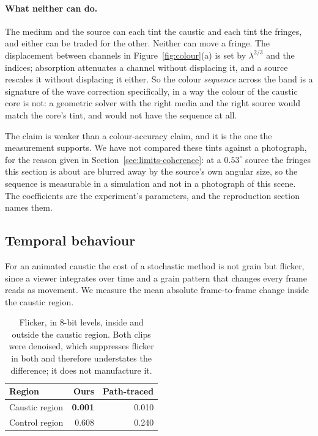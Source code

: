\paragraph{What neither can do.}
The medium and the source can each tint the caustic and each tint the fringes, and
either can be traded for the other. Neither can move a fringe. The displacement
between channels in Figure~\ref{fig:colour}(a) is set by $\lambda^{2/3}$ and the
indices; absorption attenuates a channel without displacing it, and a source
rescales it without displacing it either. So the colour \emph{sequence} across the
band is a signature of the wave correction specifically, in a way the colour of the
caustic core is not: a geometric solver with the right media and the right source
would match the core's tint, and would not have the sequence at all.

The claim is weaker than a colour-accuracy claim, and it is the one the
measurement supports. We have not compared these tints against a photograph, for
the reason given in Section~\ref{sec:limits-coherence}: at a $0.53^\circ$
source the fringes this section is about are blurred away by the source's own
angular size, so the sequence is measurable in a simulation and not in a
photograph of this scene. The coefficients are the experiment's parameters, and the reproduction section names them.

\subsection{Temporal behaviour}
\label{sec:results-flicker}

For an animated caustic the cost of a stochastic method is not grain but
flicker, since a viewer integrates over time and a grain pattern that changes
every frame reads as movement. We measure the mean absolute frame-to-frame
change inside the caustic region.

\begin{table}[tbp]
\centering
\caption{Flicker, in 8-bit levels, inside and outside the caustic region. Both
clips were denoised, which suppresses flicker in both and therefore understates
the difference; it does not manufacture it.}
\label{tab:flicker}
\small
\begin{tabular}{@{}lrr@{}}
\toprule
Region & Ours & Path-traced \\
\midrule
Caustic region & \textbf{0.001} & 0.010 \\
Control region & 0.608 & 0.240 \\
\bottomrule
\end{tabular}
\end{table}

